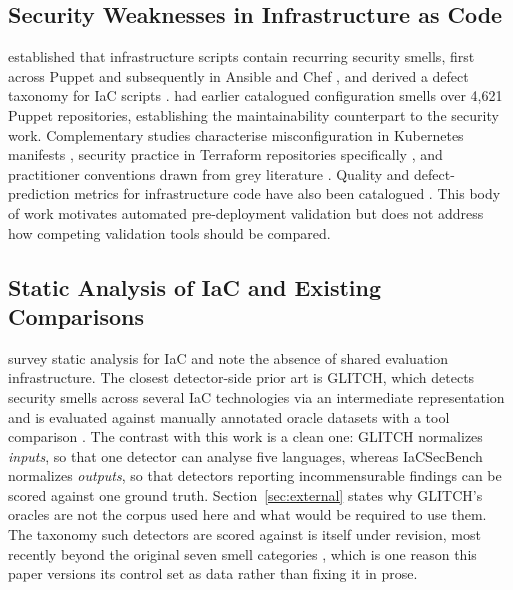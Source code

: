\documentclass[smallextended]{svjour3}
\begin{document}
\subsection{Security Weaknesses in Infrastructure as Code}
\citet{rahman2019sins} established that infrastructure scripts contain recurring
security smells, first across Puppet and subsequently in Ansible and Chef
\citep{rahman2021replication}, and derived a defect taxonomy for IaC scripts
\citep{rahman2020gang}. \citet{sharma2016smell} had earlier catalogued
configuration smells over 4,621 Puppet repositories, establishing the
maintainability counterpart to the security work. Complementary studies
characterise misconfiguration in Kubernetes manifests \citep{rahman2023k8s,
shamim2020xi}, security practice in Terraform repositories specifically
\citep{verdet2023exploring, verdet2025adoption}, and practitioner conventions
drawn from grey literature \citep{kumara2021dos}. Quality and defect-prediction
metrics for infrastructure code have also been catalogued
\citep{dallapalma2020catalog, dallapalma2022within}. This body of work motivates
automated pre-deployment validation but does not address how competing validation
tools should be compared.

\subsection{Static Analysis of IaC and Existing Comparisons}
\citet{chiari2022static} survey static analysis for IaC and note the absence of
shared evaluation infrastructure. The closest detector-side prior art is GLITCH,
which detects security smells across several IaC technologies via an intermediate
representation and is evaluated against manually annotated oracle datasets with a
tool comparison \citep{saavedra2022glitch, saavedra2023polyglot}. The contrast
with this work is a clean one: GLITCH normalizes \emph{inputs}, so that one
detector can analyse five languages, whereas IaCSecBench normalizes
\emph{outputs}, so that detectors reporting incommensurable findings can be
scored against one ground truth. Section~\ref{sec:external} states why GLITCH's
oracles are not the corpus used here and what would be required to use them. The
taxonomy such detectors are scored against is itself under revision, most
recently beyond the original seven smell categories \citep{war2025taxonomy},
which is one reason this paper versions its control set as data rather than
fixing it in prose.
\end{document}
